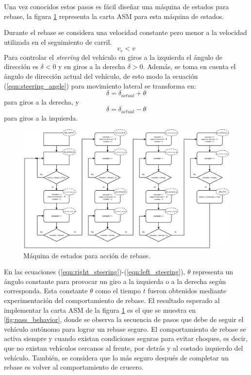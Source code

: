 Una vez conocidos estos pasos es fácil diseñar una máquina de estados para rebase, la figura \ref{fig:pass_sm} representa la carta ASM para esta máquina de estados.

Durante el rebase se considera una velocidad constante pero menor a la velocidad utilizada en el seguimiento de carril.
\begin{equation}
    v_r < v
\end{equation}
Para controlar el \textit{steering} del vehículo en giros a la izquierda el ángulo de dirección es $\delta < 0$ y en giros a la derecha $\delta > 0$. Además, se toma en cuenta el ángulo de dirección actual del vehículo, de esto modo la ecuación (\ref{eqn:steering_angle}) para movimiento lateral se transforma en:
\begin{equation}
    \delta = \delta_{actual} + \theta
    \label{eqn:right_steering}
\end{equation}
para giros a la derecha, y
\begin{equation}
    \delta = \delta_{actual} - \theta
    \label{eqn:left_steering}
\end{equation}
para giros a la izquierda.
\begin{figure}[h]
    \centering
    \includegraphics[width=1.0\textwidth]{Figures/Figures_Cap06/sm_pass.pdf}
    \caption{Máquina de estados para acción de rebase.}
    \label{fig:pass_sm}
\end{figure}

En las ecuaciones (\ref{eqn:right_steering})-(\ref{eqn:left_steering}), $\theta$ representa un ángulo constante para provocar un giro a la izquierda o a la derecha según corresponda. Esta constante $\theta$ como el tiempo $t$ fueron obtenidos mediante experimentación del comportamiento de rebase. El resultado esperado al implementar la carta ASM de la figura \ref{fig:pass_sm} es el que se muestra en \ref{fig:pass_behavior}, donde se observa la secuencia de pasos que debe de seguir el vehículo autónomo para lograr un rebase seguro. El comportamiento de rebase se activa siempre y cuando existan condiciones seguras para evitar choques, es decir, que no existan vehículos cercanos al frente, por detrás y al costado izquierdo del vehículo. También, se considera que lo más seguro después de completar un rebase es volver al comportamiento de crucero.

